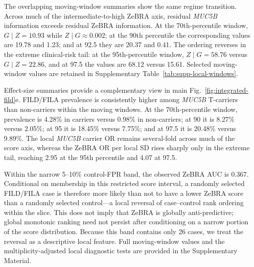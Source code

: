 The overlapping moving-window summaries show the same regime transition. Across much of the intermediate-to-high ZeBRA axis, residual \textit{MUC5B} information exceeds residual ZeBRA information. At the 70th-percentile window, $G\mid Z=10.93$ while $Z\mid G\approx0.002$; at the 90th percentile the corresponding values are 19.78 and 1.23; and at 92.5 they are 20.37 and 0.41. The ordering reverses in the extreme clinical-risk tail: at the 95th-percentile window, $Z\mid G=58.76$ versus $G\mid Z=22.86$, and at 97.5 the values are 68.12 versus 15.61. Selected moving-window values are retained in Supplementary Table~\ref{tab:supp-local-windows}.

Effect-size summaries provide a complementary view in main Fig.~\ref{fig:integrated-fild}e. FILD/FILA prevalence is consistently higher among \textit{MUC5B} T-carriers than non-carriers within the moving windows. At the 70th-percentile window, prevalence is 4.28\% in carriers versus 0.98\% in non-carriers; at 90 it is 8.27\% versus 2.05\%; at 95 it is 18.45\% versus 7.75\%; and at 97.5 it is 20.48\% versus 9.89\%. The local \textit{MUC5B} carrier OR remains several-fold across much of the score axis, whereas the ZeBRA OR per local SD rises sharply only in the extreme tail, reaching 2.95 at the 95th percentile and 4.07 at 97.5.

Within the narrow 5--10\% control-FPR band, the observed ZeBRA AUC is 0.367. Conditional on membership in this restricted score interval, a randomly selected FILD/FILA case is therefore more likely than not to have a lower ZeBRA score than a randomly selected control---a local reversal of case--control rank ordering within the slice. This does not imply that ZeBRA is globally anti-predictive; global monotonic ranking need not persist after conditioning on a narrow portion of the score distribution. Because this band contains only 26 cases, we treat the reversal as a descriptive local feature. Full moving-window values and the multiplicity-adjusted local diagnostic tests are provided in the Supplementary Material.

